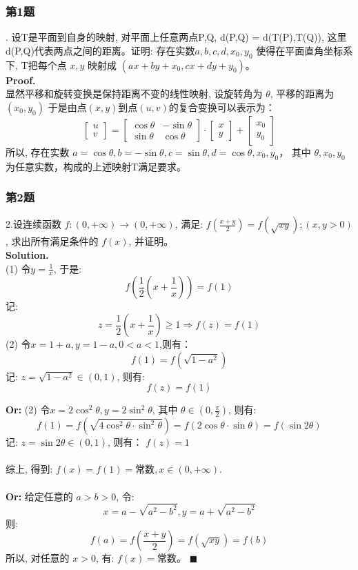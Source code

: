 \documentclass[UTF8]{article}
\begin{document}
\subsubsection{第1题}
. 设T是平面到自身的映射, 对平面上任意两点P,Q, d(P,Q) = d(T(P),T(Q)), 这里d(P,Q)代表两点之间的距离。证明: 存在实数$a,b,c,d,x_0,y_0$ 使得在平面直角坐标系下, T把每个点 $x,y$ 映射成 $(ax+by+x_0, cx+dy+y_0)$。\\
\textbf{Proof.} \\
显然平移和旋转变换是保持距离不变的线性映射, 设旋转角为 $\theta$, 平移的距离为$(x_0,y_0)$ 于是由点$(x,y)$到点$(u,v)$的复合变换可以表示为： \\
$$
\begin{bmatrix}
u \\
v
\end{bmatrix} =
\begin{bmatrix}
\cos \theta & -\sin \theta \\
\sin \theta & \cos \theta 
\end{bmatrix} \cdot 
\begin{bmatrix}
x \\
y
\end{bmatrix} + 
\begin{bmatrix}
x_0 \\
y_0
\end{bmatrix}
$$
所以, 存在实数 $a=\cos \theta, b=-\sin \theta, c=\sin \theta, d=\cos \theta, x_0,y_0$， 其中 $\theta, x_0,y_0$ 为任意实数，构成的上述映射T满足要求。

\subsubsection{第2题}
\noindent 2.设连续函数 $f: (0,+\infty) \longrightarrow (0,+\infty)$, 满足: $f(\frac{x+y}{2}) = f(\sqrt{xy}); (x,y>0)$ , 求出所有满足条件的 $f(x)$, 并证明。\\
\textbf{Solution.} \\
(1) 令$y=\frac{1}{x}$, 于是:
$$f\left (\frac{1}{2}(x+\frac{1}{x})\right) = f(1)$$
记: 
$$z=\frac{1}{2}(x+\frac{1}{x}) \ge 1 \Longrightarrow f(z) = f(1) $$
(2) 令$x=1+a,y=1-a , 0<a<1$,则有：
$$f(1) = f(\sqrt{1-a^2})$$
记:  $z=\sqrt{1-a^2} \in (0,1)$, 则有:
$$f(z) = f(1)$$

\noindent \textbf{Or: }(2) 令$x=2\cos^2\theta, y=2\sin^2\theta$, 其中 $\theta \in (0,\frac{\pi}{2})$, 则有:
$$f(1) = f(\sqrt{4\cos^2\theta \cdot \sin^2\theta}) = f(2\cos\theta \cdot \sin \theta) = f(\sin 2\theta)$$
记: $z=\sin2\theta \in (0,1)$, 则有： $f(z) =1$
\\
\\
综上, 得到: $f(x)=f(1) = \text{常数}, x\in (0,+\infty).$
\\
\\
\noindent \textbf{Or:} 给定任意的 $a>b>0$, 令:
$$ x = a - \sqrt{a^2-b^2}, y = a + \sqrt{a^2-b^2}$$
则:
$$ f(a) = f(\frac{x+y}{2}) = f(\sqrt{xy}) = f(b) $$
所以, 对任意的 $x>0$, 有: $f(x) = $常数。 $\blacksquare$
\end{document}
